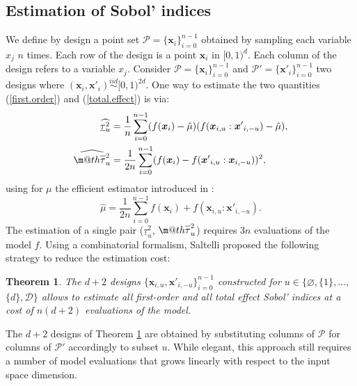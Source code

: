\documentclass[]{elsarticle}
\makeatletter
\newtheorem{theorem}{Theorem}
\theoremstyle{definition}
\newcommand{\bvec}[1]{\boldsymbol{#1}}
\newcommand{\vx}{\bvec{x}}
\newcommand\iid{\stackrel{iid}{\sim}}
\newcommand*{\ov}[1]{
  \m@th\overline{\mbox{#1}\raisebox{2mm}{}}
}
\makeatother
\begin{document}
\subsection{Estimation of Sobol' indices}

We define by design a point set $\mathcal{P}=\{\vx_i\}_{i=0}^{n-1}$ obtained by sampling each variable $x_j$ $n$ times. Each row of the design is a point $\vx_i$ in $[0,1)^d$. Each column of the design refers to a variable $x_j$. Consider $\mathcal{P}=\{\vx_i\}_{i=0}^{n-1}$ and $\mathcal{P'}=\{{\vx'}_i\}_{i=0}^{n-1}$ two designs where $(\vx_i,{\vx'}_i) \iid [0,1)^{2d}$. One way to estimate the two quantities (\ref{first.order}) and (\ref{total.effect}) is via:
\begin{align}
\label{first.order.est}
\widehat{\underline{\tau}_u^2} & = \frac{1}{n} \sum \limits_{i=0}^{n-1} (f(\vx_i)-\hat{\mu})(f(\vx_{i,u}:{\vx'}_{i,-u})-\hat{\mu}),\\
\label{total.effect.est}
\widehat{\ov{$\tau$}_u^2} & = \frac{1}{2n} \sum \limits_{i=0}^{n-1} (f(\vx_i) - f({\vx'}_{i,u}:\vx_{i,-u}))^2,
\end{align}
using for $\mu$ the efficient estimator introduced in \cite{Monod, Janon}:
\begin{equation}
 \hat{\mu} = \frac{1}{2n} \sum \limits_{i=0}^{n-1} f(\vx_i) + f(\vx_{i,u}:{\vx'}_{i,-u}).
\label{mu.est}
\end{equation}
The estimation of a single pair ($\underline{\tau}_u^2$, $\ov{$\tau$}_u^2$) requires $3n$ evaluations of the model $f$. Using a combinatorial formalism, Saltelli \cite[Theorem 1]{Saltelli} proposed the following strategy to reduce the estimation cost:
\begin{theorem}
\label{saltelli.theorem}
The $d+2$ designs $\{\vx_{i,u},{\vx'}_{i,-u}\}_{i=0}^{n-1}$ constructed for $u \in \{\varnothing,\{1\},\dots,$ $\{d\},\mathcal{D}\}$ allows to estimate all first-order and all total effect Sobol' indices at a cost of $n(d+2)$ evaluations of the model.
\end{theorem}
The $d+2$ designs of Theorem \ref{saltelli.theorem} are obtained by substituting columns of $\mathcal{P}$ for columns of $\mathcal{P}'$ accordingly to subset $u$. While elegant, this approach still requires a number of model evaluations that grows linearly with respect to the input space dimension.
\end{document}
